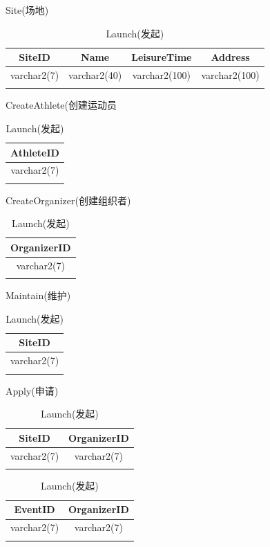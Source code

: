 \documentclass[a4paper,UTF8]{article}
\begin{document}
\begin{table}[H]
	\centering
	\caption{Site(场地)}
	\label{table:Tab_db_site}
	\begin{tabular}{|c|c|c|c|}
		\hline\noalign{\smallskip}
		SiteID & Name & LeisureTime & Address \\
		\hline
		varchar2(7) & varchar2(40) & varchar2(100) & varchar2(100)\\
		\noalign{\smallskip}
		\hline
		\noalign{\smallskip}
	\end{tabular}

	\caption{CreateAthlete(创建运动员}
	\label{table:Tab_db_ca}
	\begin{tabular}{|c|}
		\hline\noalign{\smallskip}
		AthleteID  \\
		\hline
		varchar2(7) \\
		\noalign{\smallskip}
		\hline
		\noalign{\smallskip}
	\end{tabular}
		
	\caption{CreateOrganizer(创建组织者)}
	\label{table:Tab_db_co}
	\begin{tabular}{|c|}
		\hline\noalign{\smallskip}
		OrganizerID  \\
		\hline
		varchar2(7) \\
		\noalign{\smallskip}
		\hline
		\noalign{\smallskip}
	\end{tabular}

	\caption{Maintain(维护)}
	\label{table:Tab_db_maintain}
	\begin{tabular}{|c|}
		\hline\noalign{\smallskip}
		SiteID \\
		\hline
		varchar2(7) \\
		\noalign{\smallskip}
		\hline
		\noalign{\smallskip}
	\end{tabular}
	
	\caption{Apply(申请)}
	\label{table:Tab_db_apply}
	\begin{tabular}{|c|c|}
		\hline\noalign{\smallskip}
		SiteID & OrganizerID \\
		\hline
		varchar2(7) & varchar2(7) \\
		\noalign{\smallskip}
		\hline
		\noalign{\smallskip}
	\end{tabular}

	\caption{Launch(发起)}
	\label{table:Tab_db_launch}
	\begin{tabular}{|c|c|}
		\hline\noalign{\smallskip}
		EventID & OrganizerID \\
		\hline
		varchar2(7) & varchar2(7) \\
		\noalign{\smallskip}
		\hline
		\noalign{\smallskip}
	\end{tabular}


\end{table}
\end{document}

